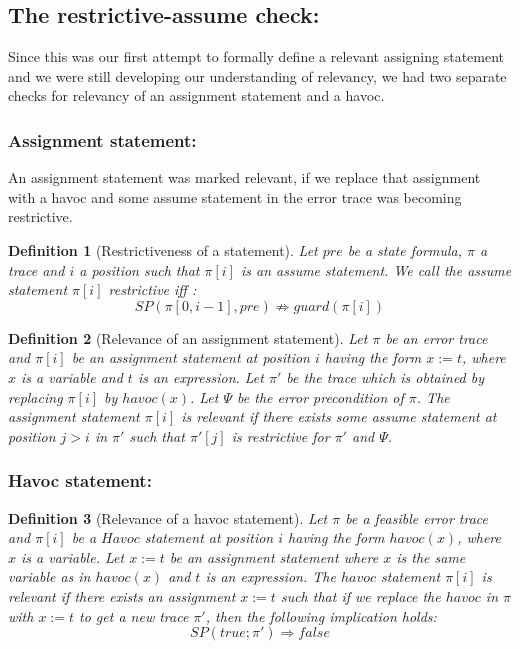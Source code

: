 \documentclass{article}
\newcommand{\limp}{\Rightarrow}
\newtheorem{mydef}{Definition}
\begin{document}
\subsection{The restrictive-assume check:}
Since this was our first attempt to formally define a relevant assigning statement and we were still developing our understanding of relevancy, we had two separate checks for relevancy of an assignment statement and a havoc.
\subsubsection{Assignment statement:}
An assignment statement was marked relevant, if we replace that assignment with a havoc and some assume statement in the error trace was becoming restrictive.
\begin{mydef}[Restrictiveness of a statement]
Let $pre$ be a state formula, $\pi$ a trace and $i$ a position such that $\pi[i]$ is an assume statement. We call the assume statement $\pi[i]$ \emph{restrictive} iff :
$$SP(\pi[0,i-1], pre) \not \limp guard(\pi[i])$$
\end{mydef}

\begin{mydef}[Relevance of an assignment statement]
Let $\pi$ be an error trace and $\pi[i]$ be an assignment statement at position $i$ having the form $x:=t$, where $x$ is a variable and $t$ is an expression. Let $\pi'$ be the trace which is obtained by replacing $\pi[i]$ by  $havoc(x)$. Let $\Psi$ be the error precondition of $\pi$. The assignment statement $\pi[i]$ is \emph{relevant} if there exists some assume statement at position $j > i$ in $\pi'$ such that $\pi'[j]$ is restrictive for $\pi'$ and $\Psi$. 
\end{mydef}

\subsubsection{Havoc statement:}
\begin{mydef}[Relevance of a havoc statement]
Let $\pi$ be a feasible error trace and $\pi[i]$ be a $Havoc$ statement at position $i$ having the form $havoc(x)$, where $x$ is a variable. Let $x:=t$ be an assignment statement where $x$ is the same variable as in $havoc(x)$ and $t$ is an expression. The $havoc$ statement $\pi[i]$ is relevant if there exists an assignment $x:=t$ such that if we replace the $havoc$ in $\pi$ with $x:=t$ to get a new trace $\pi'$, then the following implication holds:
$$SP(true; \pi') \Rightarrow false$$
\end{mydef}
\end{document}
